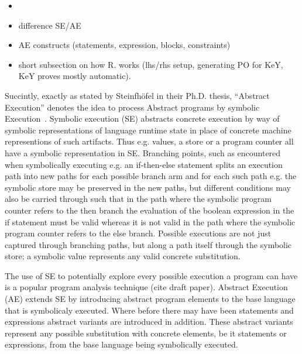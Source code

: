 \begin{itemize}
\item {}
\item difference SE/AE
\item AE constructs (statements, expression, blocks, constraints)
\item short subsection on how R. works (lhs/rhs setup, generating PO
  for KeY, KeY proves mostly automatic).
\end{itemize}


Succintly, exactly as stated by Steinfhöfel in their Ph.D. thesis, “Abstract Execution” denotes the idea to process Abstract programs by symbolic Execution~\cite{steinhoefel-20}.
Symbolic execution (SE) \cite{DBLP:journals/csur/BaldoniCDDF18,DBLP:journals/ac/YangFBCW19} abstracts concrete execution by way of symbolic representations of language runtime
state in place of concrete machine representions of such artifacts.
Thus e.g. values, a store or a program counter all have a symbolic representation in SE.
Branching points, such as encountered when symbolically executing e.g. an if-then-else statement splits an execution path into new paths for each possible branch arm and for each such
path e.g. the symbolic store may be preserved in the new paths, but different conditions may also be carried through such that in the path where the symbolic program counter refers
to the then branch the evaluation of the boolean expression in the if statement must be valid whereas it is not valid in the path where the symbolic program counter refers to the else branch.
Possible executions are not just captured through branching paths, but along a path itself through the symbolic store; a symbolic value represents any valid concrete substitution.

The use of SE to potentially explore every possible execution a program can have is a popular program analysis technique (cite draft paper). Abstract Execution (AE) extends SE by
introducing abstract program elements to the base language that is symbolicaly executed.
Where before there may have been statements and expressions abstract variants are introduced in addition.
These abstract variants represent any possible substitution with concrete elements, be it statements or expressions, from the base language being symbolically executed.
